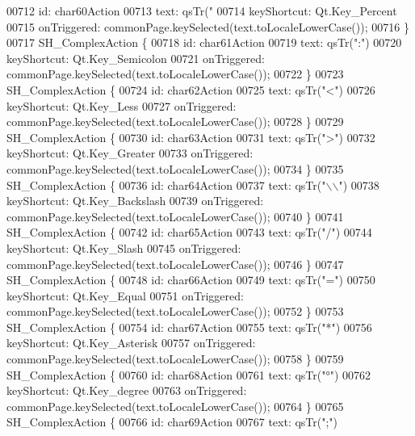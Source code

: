 \begin{DoxyCode}
00712         \textcolor{keywordtype}{id}: char60Action
00713         text: qsTr(\textcolor{stringliteral}{"%
00714         keyShortcut: Qt.Key\_Percent
00715         onTriggered: commonPage.keySelected(text.toLocaleLowerCase());
00716     \}
00717     SH\_ComplexAction \{
00718         \textcolor{keywordtype}{id}: char61Action
00719         text: qsTr(\textcolor{stringliteral}{":"})
00720         keyShortcut: Qt.Key\_Semicolon
00721         onTriggered: commonPage.keySelected(text.toLocaleLowerCase());
00722     \}
00723     SH\_ComplexAction \{
00724         \textcolor{keywordtype}{id}: char62Action
00725         text: qsTr(\textcolor{stringliteral}{"<"})
00726         keyShortcut: Qt.Key\_Less
00727         onTriggered: commonPage.keySelected(text.toLocaleLowerCase());
00728     \}
00729     SH\_ComplexAction \{
00730         \textcolor{keywordtype}{id}: char63Action
00731         text: qsTr(\textcolor{stringliteral}{">"})
00732         keyShortcut: Qt.Key\_Greater
00733         onTriggered: commonPage.keySelected(text.toLocaleLowerCase());
00734     \}
00735     SH\_ComplexAction \{
00736         \textcolor{keywordtype}{id}: char64Action
00737         text: qsTr(\textcolor{stringliteral}{"\(\backslash\)\(\backslash\)"})
00738         keyShortcut: Qt.Key\_Backslash
00739         onTriggered: commonPage.keySelected(text.toLocaleLowerCase());
00740     \}
00741     SH\_ComplexAction \{
00742         \textcolor{keywordtype}{id}: char65Action
00743         text: qsTr(\textcolor{stringliteral}{"/"})
00744         keyShortcut: Qt.Key\_Slash
00745         onTriggered: commonPage.keySelected(text.toLocaleLowerCase());
00746     \}
00747     SH\_ComplexAction \{
00748         \textcolor{keywordtype}{id}: char66Action
00749         text: qsTr(\textcolor{stringliteral}{"="})
00750         keyShortcut: Qt.Key\_Equal
00751         onTriggered: commonPage.keySelected(text.toLocaleLowerCase());
00752     \}
00753     SH\_ComplexAction \{
00754         \textcolor{keywordtype}{id}: char67Action
00755         text: qsTr(\textcolor{stringliteral}{"*"})
00756         keyShortcut: Qt.Key\_Asterisk
00757         onTriggered: commonPage.keySelected(text.toLocaleLowerCase());
00758     \}
00759     SH\_ComplexAction \{
00760         \textcolor{keywordtype}{id}: char68Action
00761         text: qsTr(\textcolor{stringliteral}{"°"})
00762         keyShortcut: Qt.Key\_degree
00763         onTriggered: commonPage.keySelected(text.toLocaleLowerCase());
00764     \}
00765     SH\_ComplexAction \{
00766         \textcolor{keywordtype}{id}: char69Action
00767         text: qsTr(\textcolor{stringliteral}{";"})
}
\end{DoxyCode}
